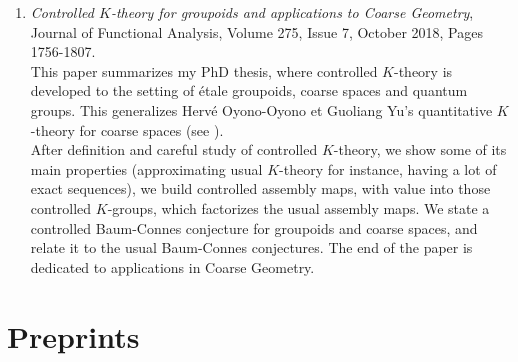 \documentclass[a4paper]{article}
\begin{document}
\begin{enumerate}
\item \textit{Controlled $K$-theory for groupoids and applications to Coarse Geometry}, Journal of Functional Analysis, Volume 275, Issue 7, October 2018, Pages 1756-1807. \\

This paper summarizes my PhD thesis, where controlled $K$-theory is developed to the setting of \'etale groupoids, coarse spaces and quantum groups. This generalizes Herv\'e Oyono-Oyono et Guoliang Yu's quantitative $K$-theory for coarse spaces (see \cite{OY1}\cite{OY2}\cite{OY3}\cite{oyono2019quantitative}). \\

After definition and careful study of controlled $K$-theory, we show some of its main properties (approximating usual $K$-theory for instance, having a lot of exact sequences), we build controlled assembly maps, with value into those controlled $K$-groups, which factorizes the usual assembly maps. We state a controlled Baum-Connes conjecture for groupoids and coarse spaces, and relate it to the usual Baum-Connes conjectures. The end of the paper is dedicated to applications in Coarse Geometry.                                                                                                                                           
\end{enumerate}

\section*{Preprints}
\end{document}
